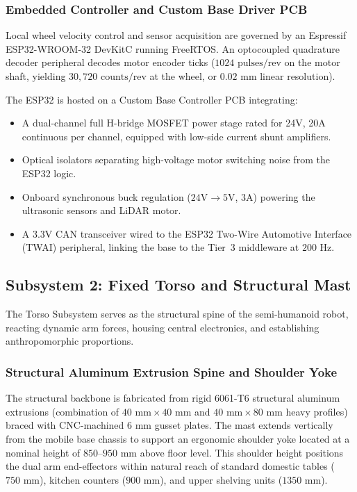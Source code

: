 \subsubsection{Embedded Controller and Custom Base Driver PCB}
Local wheel velocity control and sensor acquisition are governed by an Espressif ESP32-WROOM-32 DevKitC running FreeRTOS. An optocoupled quadrature decoder peripheral decodes motor encoder ticks ($1024\text{ pulses/rev}$ on the motor shaft, yielding $30{,}720\text{ counts/rev}$ at the wheel, or $0.02\text{ mm}$ linear resolution).

The ESP32 is hosted on a Custom Base Controller PCB integrating:
\begin{itemize}[leftmargin=1.5em]
  \item A dual-channel full H-bridge MOSFET power stage rated for 24V, 20A continuous per channel, equipped with low-side current shunt amplifiers.
  \item Optical isolators separating high-voltage motor switching noise from the ESP32 logic.
  \item Onboard synchronous buck regulation ($24\text{V} \to 5\text{V}$, $3\text{A}$) powering the ultrasonic sensors and LiDAR motor.
  \item A 3.3V CAN transceiver wired to the ESP32 Two-Wire Automotive Interface (TWAI) peripheral, linking the base to the Tier~3 middleware at $200\text{ Hz}$.
\end{itemize}

\subsection{Subsystem 2: Fixed Torso and Structural Mast}
\label{subsec:subsystem_2_torso}
The Torso Subsystem serves as the structural spine of the semi-humanoid robot, reacting dynamic arm forces, housing central electronics, and establishing anthropomorphic proportions.

\subsubsection{Structural Aluminum Extrusion Spine and Shoulder Yoke}
The structural backbone is fabricated from rigid 6061-T6 structural aluminum extrusions (combination of $40\text{ mm} \times 40\text{ mm}$ and $40\text{ mm} \times 80\text{ mm}$ heavy profiles) braced with CNC-machined $6\text{ mm}$ gusset plates. The mast extends vertically from the mobile base chassis to support an ergonomic shoulder yoke located at a nominal height of $850\text{--}950\text{ mm}$ above floor level. This shoulder height positions the dual arm end-effectors within natural reach of standard domestic tables ($750\text{ mm}$), kitchen counters ($900\text{ mm}$), and upper shelving units ($1350\text{ mm}$).

